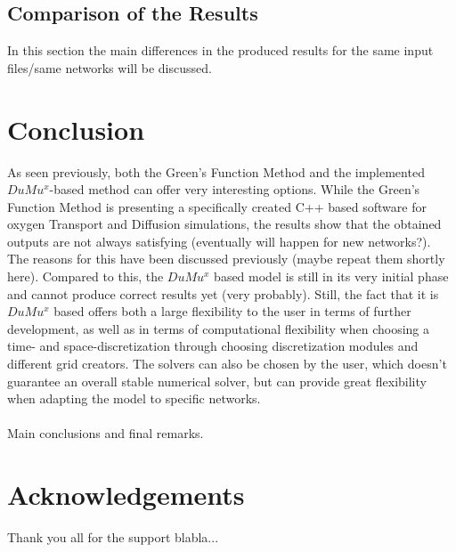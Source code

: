 \subsection{Comparison of the Results}
In this section the main differences in the produced results for the same input files/same networks will be discussed.



\section{Conclusion}

As seen previously, both the Green's Function Method and the implemented $DuMu^x$-based method can offer very interesting options. While the Green's Function Method is presenting a specifically created C++ based software for oxygen Transport and Diffusion simulations, the results show that the obtained outputs are not always satisfying (eventually will happen for new networks?). The reasons for this have been discussed previously (maybe repeat them shortly here).
Compared to this, the $DuMu^x$ based model is still in its very initial phase and cannot produce correct results yet (very probably). Still, the fact that it is $DuMu^x$ based offers both a large flexibility to the user in terms of further development, as well as in terms of computational flexibility when choosing a time- and space-discretization through choosing discretization modules and different grid creators. The solvers can also be chosen by the user, which doesn't guarantee an overall stable numerical solver, but can provide great flexibility when adapting the model to specific networks.
\\
\\Main conclusions and final remarks.


\section{Acknowledgements}
Thank you all for the support blabla...